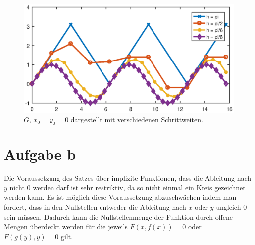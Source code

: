 \documentclass[a4paper,11pt,bibliography=totoc,listof=totoc,headinclude=true,cleardoublepage=empty,oneside]{scrartcl}
\begin{document}
\begin{figure}[h]
\centering
\includegraphics[width=0.85\linewidth]{plots/A/vieleSinuse_Schrittweiten.eps}
\caption{$G$, $x_0 = y_0 = 0$ dargestellt mit verschiedenen Schrittweiten.}
\label{fig:vieleSinuse_schrittweiten_a}
\end{figure}


\section{Aufgabe b}
Die Voraussetzung des Satzes über implizite Funktionen, dass die Ableitung nach $y$ nicht $0$ werden darf ist sehr restriktiv, da so nicht einmal ein Kreis gezeichnet werden kann. Es ist möglich diese Voraussetzung abzuschwächen indem man fordert, dass in den Nullstellen entweder die Ableitung nach $x$ oder $y$ ungleich $0$ sein müssen. Dadurch kann die Nullstellenmenge der Funktion durch offene Mengen überdeckt werden für die jeweils $F(x,f(x))=0$ oder $F(g(y),y)=0$ gilt.
\end{document}
